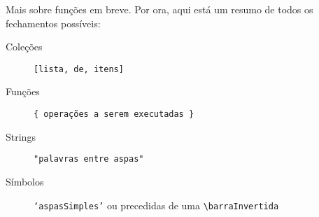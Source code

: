 Mais sobre funções em breve. Por ora, aqui está um resumo de todos os fechamentos possíveis:

\begin{description}
\item[Coleções] \texttt{[lista, de, itens]}
\item[Funções] \texttt{\{ operações a serem executadas \}}
\item[Strings] \texttt{"palavras entre aspas"}
\item[Símbolos] \texttt{‘aspasSimples’} ou precedidas de uma \texttt{\textbackslash barraInvertida}
\end{description}
